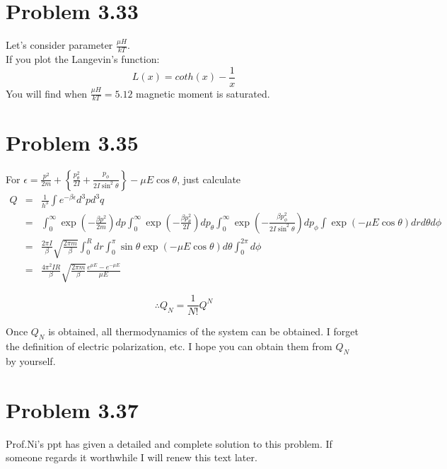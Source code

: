 \documentclass{article}
\begin{document}
\section*{Problem 3.33} %
\label{sec:problem_3_33}
	Let's consider parameter $\frac{\mu H}{kT}$.\\
	If you plot the Langevin's function:
	$$L(x)=coth(x)-\frac{1}{x}$$ 
	You will find when $\frac{\mu H}{kT}=5.12$ magnetic moment is saturated.\\



\section*{Problem 3.35} %
\label{sec:problem_3_35}
	For $ \epsilon=\frac{p^2}{2m}+\left\{ \frac{p_{\theta}^2}{2I}+\frac{p_{\phi}}{2I\sin^2 \theta} \right\} - \mu E \cos \theta $, just calculate
	\begin{eqnarray*}
		Q &=&  \frac{1}{h^3} \int e^{-\beta \epsilon} d^3pd^3q\\
		&=&\int^{\infty}_0 \exp\left(- \frac{\beta p^2}{2m} \right)dp\int^{\infty}_0 \exp\left(- \frac{\beta p_{\theta}^2}{2I} \right)dp_{\theta}\int^{\infty}_0 \exp\left(- \frac{\beta p_{\phi}^2}{2I\sin^2 \theta} \right)dp_{\phi}\int\exp(- \mu E \cos \theta) drd \theta d \phi\\
		&=&\frac{2 \pi I}{\beta} \sqrt{ \frac{2 \pi m}{\beta} } \int^R_0 dr \int^{\pi}_0 \sin \theta \exp(-\mu E \cos\theta)d \theta \int^{2 \pi}_0 d \phi\\
		&=&\frac{4 \pi^2 IR}{\beta} \sqrt{ \frac{2 \pi m}{\beta} }\frac{e^{\mu E}-e^{-\mu E}}{\mu E}
	\end{eqnarray*}

	\begin{equation*}
		\therefore Q_N = \frac{1}{N!} Q^N
	\end{equation*}

	Once $Q_N$ is obtained, all thermodynamics of the system can be obtained. I forget the definition of electric polarization, etc. I hope you can obtain them from $Q_N$ by yourself.
\section*{Problem 3.37}
Prof.Ni's ppt has given a detailed and complete solution to this problem. If someone regards it worthwhile I will renew this text later.
\end{document}
